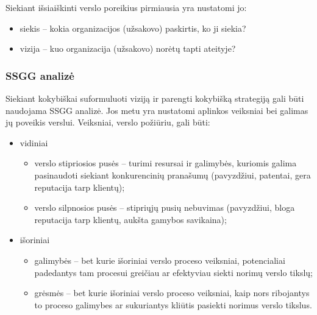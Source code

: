 Siekiant išsiaiškinti verslo poreikius pirmiausia yra nustatomi jo:
\begin{itemize}
  \item siekis – kokia organizacijos (užsakovo) paskirtis, ko ji siekia?
  \item vizija – kuo organizacija (užsakovo) norėtų tapti ateityje?
\end{itemize}


\subsubsection{SSGG analizė}

Siekiant kokybiškai suformuluoti viziją ir parengti kokybišką strategiją
gali būti naudojama SSGG  analizė. Jos metu yra 
nustatomi aplinkos veiksniai bei galimas jų poveikis verslui. Veiksniai, 
verslo požiūriu, gali būti:
\begin{itemize}
  \item vidiniai
    \begin{itemize}
      \item verslo stipriosios pusės  – turimi resursai
        ir galimybės, kuriomis galima pasinaudoti siekiant konkurencinių
        pranašumų (pavyzdžiui, patentai, gera reputacija tarp klientų);
      \item verslo silpnosios pusės  – stipriųjų pusių
        nebuvimas (pavyzdžiui, bloga reputacija tarp klientų, aukšta
        gamybos savikaina);
    \end{itemize}
  \item išoriniai
    \begin{itemize}
      \item galimybės  – bet kurie išoriniai verslo
        proceso veiksniai, potencialiai padedantys tam procesui
        greičiau ar efektyviau siekti norimų verslo tikslų;
      \item grėsmės  – bet kurie išoriniai verslo proceso
        veiksniai, kaip nors ribojantys to proceso galimybes ar 
        sukuriantys kliūtis pasiekti norimus verslo tikslus.
    \end{itemize}
\end{itemize}


